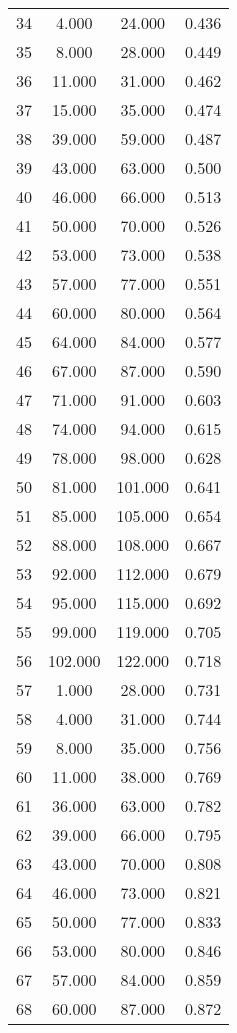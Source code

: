 \begin{tabular}{cccc}
  34 & 4.000 & 24.000 & 0.436 \\ 
  35 & 8.000 & 28.000 & 0.449 \\ 
  36 & 11.000 & 31.000 & 0.462 \\ 
  37 & 15.000 & 35.000 & 0.474 \\ 
  38 & 39.000 & 59.000 & 0.487 \\ 
  39 & 43.000 & 63.000 & 0.500 \\ 
  40 & 46.000 & 66.000 & 0.513 \\ 
  41 & 50.000 & 70.000 & 0.526 \\ 
  42 & 53.000 & 73.000 & 0.538 \\ 
  43 & 57.000 & 77.000 & 0.551 \\ 
  44 & 60.000 & 80.000 & 0.564 \\ 
  45 & 64.000 & 84.000 & 0.577 \\ 
  46 & 67.000 & 87.000 & 0.590 \\ 
  47 & 71.000 & 91.000 & 0.603 \\ 
  48 & 74.000 & 94.000 & 0.615 \\ 
  49 & 78.000 & 98.000 & 0.628 \\ 
  50 & 81.000 & 101.000 & 0.641 \\ 
  51 & 85.000 & 105.000 & 0.654 \\ 
  52 & 88.000 & 108.000 & 0.667 \\ 
  53 & 92.000 & 112.000 & 0.679 \\ 
  54 & 95.000 & 115.000 & 0.692 \\ 
  55 & 99.000 & 119.000 & 0.705 \\ 
  56 & 102.000 & 122.000 & 0.718 \\ 
  57 & 1.000 & 28.000 & 0.731 \\ 
  58 & 4.000 & 31.000 & 0.744 \\ 
  59 & 8.000 & 35.000 & 0.756 \\ 
  60 & 11.000 & 38.000 & 0.769 \\ 
  61 & 36.000 & 63.000 & 0.782 \\ 
  62 & 39.000 & 66.000 & 0.795 \\ 
  63 & 43.000 & 70.000 & 0.808 \\ 
  64 & 46.000 & 73.000 & 0.821 \\ 
  65 & 50.000 & 77.000 & 0.833 \\ 
  66 & 53.000 & 80.000 & 0.846 \\ 
  67 & 57.000 & 84.000 & 0.859 \\ 
  68 & 60.000 & 87.000 & 0.872 \\ 

\end{tabular}
